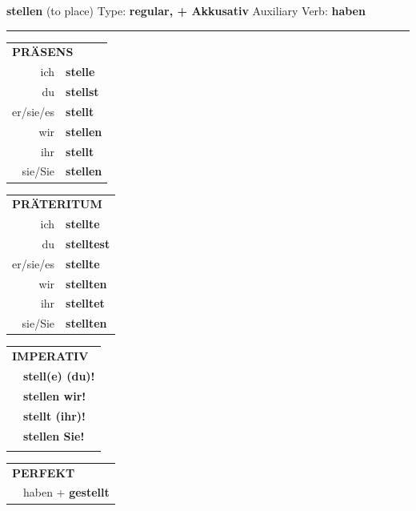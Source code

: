 \documentclass[10pt,a4paper]{revtex4-2}
\begin{document}
\begin{verbbox-acc}
    {\Large \bf stellen} (to place) \hfill Type: \textbf{regular, + Akkusativ} \hfill Auxiliary Verb: \textbf{haben} 
    
     \vspace{5pt}

    \hrule
    
    \vspace{5pt}

  \begin{tabular}{rl}
     \multicolumn{2}{l}{\textbf{PRÄSENS} }\\
    ich & \textbf{stelle}\\
    du & \textbf{stellst}\\
    er/sie/es & \textbf{stellt}\\
    wir & \textbf{stellen}\\
    ihr & \textbf{stellt}\\
    sie/Sie & \textbf{stellen}\\
  \end{tabular}
  \hfill
     \begin{tabular}{rl}
    \multicolumn{2}{l}{\textbf{PRÄTERITUM} }\\
    ich & \textbf{stellte}\\
    du & \textbf{stelltest}\\
    er/sie/es & \textbf{stellte}\\
    wir & \textbf{stellten}\\
    ihr & \textbf{stelltet}\\
    sie/Sie & \textbf{stellten}\\
  \end{tabular}
  \hfill
  \begin{tabular}{rl}
     \multicolumn{2}{l}{\textbf{IMPERATIV} }\\
   & \textbf{stell(e) (du)!}\\
   & \textbf{stellen wir!}\\
   & \textbf{stellt (ihr)!}\\
   & \textbf{stellen Sie!}\\
   & \vspace{10pt}
  \end{tabular}

    \vspace{10pt}

 \begin{tabular}{rl}
     \multicolumn{2}{l}{\textbf{PERFEKT}}\\
   & haben + \textbf{gestellt}\\
  \end{tabular}
\hfill
   \begin{tabular}{rl}
   

\end{tabular}
\end{verbbox-acc}
\end{document}
